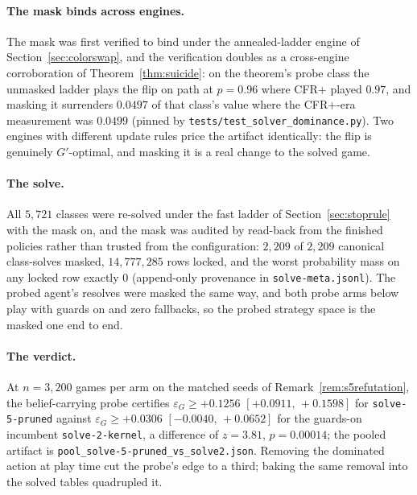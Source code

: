 \documentclass[11pt]{article}
\theoremstyle{plain}
\theoremstyle{definition}
\theoremstyle{remark}
\newcommand{\code}[1]{\texttt{\small #1}}
\newcommand{\game}{\ensuremath{G}}
\newcommand{\gp}{\ensuremath{G'}}
\newcommand{\epsG}{\ensuremath{\varepsilon_{\game}}}
\begin{document}
\paragraph{The mask binds across engines.} The mask was first
verified to bind under the annealed-ladder engine of
Section~\ref{sec:colorswap}, and the verification doubles as a
cross-engine corroboration of Theorem~\ref{thm:suicide}: on the
theorem's probe class the unmasked ladder plays the flip on path at
$p=0.96$ where CFR+ played $0.97$, and masking it surrenders
$0.0497$ of that class's value where the CFR+-era measurement was
$0.0499$ (pinned by \code{tests/test\_solver\_dominance.py}). Two
engines with different update rules price the artifact identically:
the flip is genuinely $\gp$-optimal, and masking it is a real change
to the solved game.

\paragraph{The solve.} All $5{,}721$ classes were re-solved under the
fast ladder of Section~\ref{sec:stoprule} with the mask on, and the
mask was audited by read-back from the finished policies rather than
trusted from the configuration: $2{,}209$ of $2{,}209$ canonical
class-solves masked, $14{,}777{,}285$ rows locked, and the worst
probability mass on any locked row exactly $0$ (append-only
provenance in \code{solve-meta.jsonl}). The probed agent's resolves were
masked the same way, and both probe arms below play with guards on
and zero fallbacks, so the probed strategy space is the masked one
end to end.

\paragraph{The verdict.} At $n=3{,}200$ games per arm on the matched
seeds of Remark~\ref{rem:s5refutation}, the belief-carrying probe
certifies
$\epsG \ge +0.1256$ $[+0.0911,\,+0.1598]$ for \code{solve-5-pruned}
against $\epsG \ge +0.0306$ $[-0.0040,\,+0.0652]$ for the guards-on
incumbent \code{solve-2-kernel}, a difference of $z=3.81$,
$p=0.00014$; the pooled artifact is
\code{pool\_solve-5-pruned\_vs\_solve2.json}. Removing the dominated
action at play time cut the probe's edge to a third; baking the same
removal into the solved tables quadrupled it.
\end{document}
